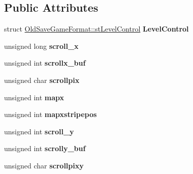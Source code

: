 \subsection*{Public Attributes}
\begin{DoxyCompactItemize}
\item 
\hypertarget{struct_old_save_game_format_a8693ba213c8f76c878efc2f4bb30d801}{
struct \hyperlink{struct_old_save_game_format_1_1st_level_control}{OldSaveGameFormat::stLevelControl} {\bfseries LevelControl}}
\label{struct_old_save_game_format_a8693ba213c8f76c878efc2f4bb30d801}

\item 
\hypertarget{struct_old_save_game_format_a928a820a5d575267b4787b85b28c11be}{
unsigned long {\bfseries scroll\_\-x}}
\label{struct_old_save_game_format_a928a820a5d575267b4787b85b28c11be}

\item 
\hypertarget{struct_old_save_game_format_a6c8879caf5a32d9e9371e4bfd4c7f9f9}{
unsigned int {\bfseries scrollx\_\-buf}}
\label{struct_old_save_game_format_a6c8879caf5a32d9e9371e4bfd4c7f9f9}

\item 
\hypertarget{struct_old_save_game_format_a987c46ce53d6a7477359d42103aaad75}{
unsigned char {\bfseries scrollpix}}
\label{struct_old_save_game_format_a987c46ce53d6a7477359d42103aaad75}

\item 
\hypertarget{struct_old_save_game_format_aeac01bff2eb3d5946e5054fd71e12a76}{
unsigned int {\bfseries mapx}}
\label{struct_old_save_game_format_aeac01bff2eb3d5946e5054fd71e12a76}

\item 
\hypertarget{struct_old_save_game_format_afba8b29b6a29f377628b557764cacec8}{
unsigned int {\bfseries mapxstripepos}}
\label{struct_old_save_game_format_afba8b29b6a29f377628b557764cacec8}

\item 
\hypertarget{struct_old_save_game_format_a0bb1551064f35c3373905a62210e410e}{
unsigned int {\bfseries scroll\_\-y}}
\label{struct_old_save_game_format_a0bb1551064f35c3373905a62210e410e}

\item 
\hypertarget{struct_old_save_game_format_a9d2be0b48454d5269d637f6363ad30bb}{
unsigned int {\bfseries scrolly\_\-buf}}
\label{struct_old_save_game_format_a9d2be0b48454d5269d637f6363ad30bb}

\item 
\hypertarget{struct_old_save_game_format_af65f3a96e1fccea6783c8fd16d1f48dc}{
unsigned char {\bfseries scrollpixy}}
\label{struct_old_save_game_format_af65f3a96e1fccea6783c8fd16d1f48dc}


\end{DoxyCompactItemize}
